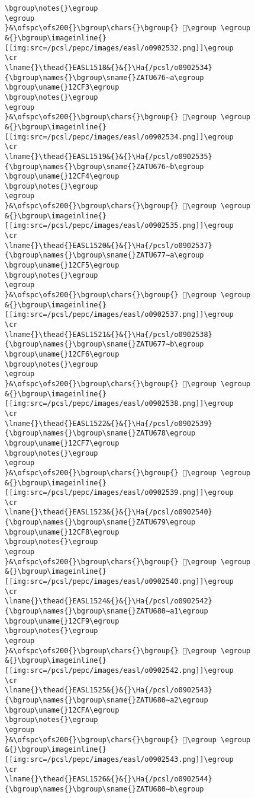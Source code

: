 \begin{verbatim}
\bgroup\notes{}\egroup
\egroup
}&\ofspc\ofs200{}\bgroup\chars{}\bgroup{} 𒳲\egroup \egroup
&{}\bgroup\imageinline{}[[img:src=/pcsl/pepc/images/easl/o0902532.png]]\egroup
\cr
\lname{}\thead{}EASL1518&{}&{}\Ha{/pcsl/o0902534}{\bgroup\names{}\bgroup\sname{}ZATU676∼a\egroup
\bgroup\uname{}12CF3\egroup
\bgroup\notes{}\egroup
\egroup
}&\ofspc\ofs200{}\bgroup\chars{}\bgroup{} 𒳳\egroup \egroup
&{}\bgroup\imageinline{}[[img:src=/pcsl/pepc/images/easl/o0902534.png]]\egroup
\cr
\lname{}\thead{}EASL1519&{}&{}\Ha{/pcsl/o0902535}{\bgroup\names{}\bgroup\sname{}ZATU676∼b\egroup
\bgroup\uname{}12CF4\egroup
\bgroup\notes{}\egroup
\egroup
}&\ofspc\ofs200{}\bgroup\chars{}\bgroup{} 𒳴\egroup \egroup
&{}\bgroup\imageinline{}[[img:src=/pcsl/pepc/images/easl/o0902535.png]]\egroup
\cr
\lname{}\thead{}EASL1520&{}&{}\Ha{/pcsl/o0902537}{\bgroup\names{}\bgroup\sname{}ZATU677∼a\egroup
\bgroup\uname{}12CF5\egroup
\bgroup\notes{}\egroup
\egroup
}&\ofspc\ofs200{}\bgroup\chars{}\bgroup{} 𒳵\egroup \egroup
&{}\bgroup\imageinline{}[[img:src=/pcsl/pepc/images/easl/o0902537.png]]\egroup
\cr
\lname{}\thead{}EASL1521&{}&{}\Ha{/pcsl/o0902538}{\bgroup\names{}\bgroup\sname{}ZATU677∼b\egroup
\bgroup\uname{}12CF6\egroup
\bgroup\notes{}\egroup
\egroup
}&\ofspc\ofs200{}\bgroup\chars{}\bgroup{} 𒳶\egroup \egroup
&{}\bgroup\imageinline{}[[img:src=/pcsl/pepc/images/easl/o0902538.png]]\egroup
\cr
\lname{}\thead{}EASL1522&{}&{}\Ha{/pcsl/o0902539}{\bgroup\names{}\bgroup\sname{}ZATU678\egroup
\bgroup\uname{}12CF7\egroup
\bgroup\notes{}\egroup
\egroup
}&\ofspc\ofs200{}\bgroup\chars{}\bgroup{} 𒳷\egroup \egroup
&{}\bgroup\imageinline{}[[img:src=/pcsl/pepc/images/easl/o0902539.png]]\egroup
\cr
\lname{}\thead{}EASL1523&{}&{}\Ha{/pcsl/o0902540}{\bgroup\names{}\bgroup\sname{}ZATU679\egroup
\bgroup\uname{}12CF8\egroup
\bgroup\notes{}\egroup
\egroup
}&\ofspc\ofs200{}\bgroup\chars{}\bgroup{} 𒳸\egroup \egroup
&{}\bgroup\imageinline{}[[img:src=/pcsl/pepc/images/easl/o0902540.png]]\egroup
\cr
\lname{}\thead{}EASL1524&{}&{}\Ha{/pcsl/o0902542}{\bgroup\names{}\bgroup\sname{}ZATU680∼a1\egroup
\bgroup\uname{}12CF9\egroup
\bgroup\notes{}\egroup
\egroup
}&\ofspc\ofs200{}\bgroup\chars{}\bgroup{} 𒳹\egroup \egroup
&{}\bgroup\imageinline{}[[img:src=/pcsl/pepc/images/easl/o0902542.png]]\egroup
\cr
\lname{}\thead{}EASL1525&{}&{}\Ha{/pcsl/o0902543}{\bgroup\names{}\bgroup\sname{}ZATU680∼a2\egroup
\bgroup\uname{}12CFA\egroup
\bgroup\notes{}\egroup
\egroup
}&\ofspc\ofs200{}\bgroup\chars{}\bgroup{} 𒳺\egroup \egroup
&{}\bgroup\imageinline{}[[img:src=/pcsl/pepc/images/easl/o0902543.png]]\egroup
\cr
\lname{}\thead{}EASL1526&{}&{}\Ha{/pcsl/o0902544}{\bgroup\names{}\bgroup\sname{}ZATU680∼b\egroup

\end{verbatim}

